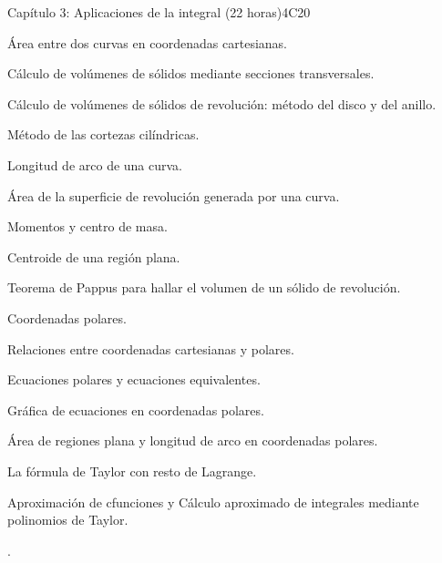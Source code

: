 \begin{syllabus}
\begin{unit}{Capítulo 3: Aplicaciones de la integral (22 horas)}{}{}{4}{C20}


\begin{topics}
      \item Área entre dos curvas en coordenadas cartesianas. 
      \item Cálculo de volúmenes de sólidos mediante secciones transversales. 
      \item Cálculo de volúmenes de sólidos de revolución: método del disco y del anillo.
      \item Método de las cortezas cilíndricas.
      \item Longitud de arco de una curva. 
      \item Área de la superficie de revolución generada por una curva. 
      \item Momentos y centro de masa. 
      \item Centroide de una región plana. 
      \item Teorema de Pappus para hallar el volumen de un sólido de revolución.
      \item Coordenadas polares. 
      \item Relaciones entre coordenadas cartesianas y polares. 
      \item Ecuaciones polares y ecuaciones equivalentes. 
      \item Gráfica de ecuaciones en coordenadas polares.
      \item Área de regiones plana y longitud de arco en coordenadas polares. 
      \item La fórmula de Taylor con resto de Lagrange. 
      \item Aproximación de cfunciones y Cálculo aproximado de integrales mediante polinomios de 				Taylor.
\end{topics}

   \begin{learningoutcomes}
      \item .
   \end{learningoutcomes}
\end{unit}


\end{syllabus}
